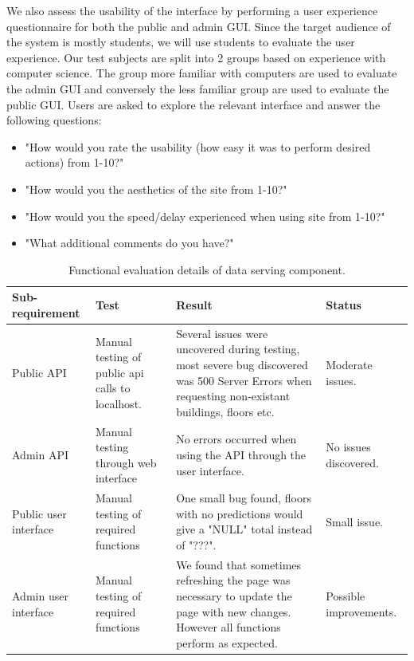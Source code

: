 \documentclass{l4proj}
\begin{document}
We also assess the usability of the interface by performing a user experience questionnaire for both the public and admin GUI. Since the target audience of the system is mostly students, we will use students to evaluate the user experience. Our test subjects are split into 2 groups based on experience with computer science. The group more familiar with computers are used to evaluate the admin GUI and conversely the less familiar group are used to evaluate the public GUI. Users are asked to explore the relevant interface and answer the following questions:

\begin{itemize}	
  \item "How would you rate the usability (how easy it was to perform desired actions) from 1-10?"
  \item "How would you the aesthetics of the site from 1-10?"
  \item "How would you the speed/delay experienced when using site from 1-10?"
  \item "What additional comments do you have?"
\end{itemize}



\begin{table}
\begin{tabularx}{\textwidth}{|X|X|X|X|}
\hline
\textbf{Sub-requirement} & \textbf{Test} & \textbf{Result} & \textbf{Status}\tabularnewline
\hline
Public API & Manual testing of public api calls to localhost. & Several issues were uncovered during testing, most severe bug discovered was 500 Server Errors when requesting non-existant buildings, floors etc. & Moderate issues. \\
\hline
Admin API & Manual testing through web interface & No errors occurred when using the API through the user interface. & No issues discovered. \\
\hline
Public user interface & Manual testing of required functions & One small bug found, floors with no predictions would give a "NULL" total instead of "???". & Small issue. \\
\hline
Admin user interface & Manual testing of required functions & We found that sometimes refreshing the page was necessary to update the page with new changes. However all functions perform as expected. & Possible improvements. \\
\hline
\end{tabularx}
\caption{Functional evaluation details of data serving component.}
\label{table:evaldata}
\end{table}
\end{document}
